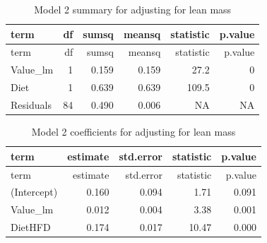 \documentclass[]{article}
\newenvironment{Shaded}{\begin{snugshade}}{\end{snugshade}}
\newcommand{\DataTypeTok}[1]{\textcolor[rgb]{0.13,0.29,0.53}{#1}}
\newcommand{\FloatTok}[1]{\textcolor[rgb]{0.00,0.00,0.81}{#1}}
\newcommand{\KeywordTok}[1]{\textcolor[rgb]{0.13,0.29,0.53}{\textbf{#1}}}
\newcommand{\NormalTok}[1]{#1}
\newcommand{\OperatorTok}[1]{\textcolor[rgb]{0.81,0.36,0.00}{\textbf{#1}}}
\newcommand{\StringTok}[1]{\textcolor[rgb]{0.31,0.60,0.02}{#1}}
\begin{document}
\begin{Shaded}
\end{Shaded}

\begin{longtable}[]{@{}lrrrrr@{}}
\caption{Model 2 summary for adjusting for lean mass}\tabularnewline
\toprule
term & df & sumsq & meansq & statistic & p.value\tabularnewline
\midrule
\endfirsthead
\toprule
term & df & sumsq & meansq & statistic & p.value\tabularnewline
\midrule
\endhead
Value\_lm & 1 & 0.159 & 0.159 & 27.2 & 0\tabularnewline
Diet & 1 & 0.639 & 0.639 & 109.5 & 0\tabularnewline
Residuals & 84 & 0.490 & 0.006 & NA & NA\tabularnewline
\bottomrule
\end{longtable}

\begin{Shaded}
\end{Shaded}

\begin{longtable}[]{@{}lrrrr@{}}
\caption{Model 2 coefficients for adjusting for lean
mass}\tabularnewline
\toprule
term & estimate & std.error & statistic & p.value\tabularnewline
\midrule
\endfirsthead
\toprule
term & estimate & std.error & statistic & p.value\tabularnewline
\midrule
\endhead
(Intercept) & 0.160 & 0.094 & 1.71 & 0.091\tabularnewline
Value\_lm & 0.012 & 0.004 & 3.38 & 0.001\tabularnewline
DietHFD & 0.174 & 0.017 & 10.47 & 0.000\tabularnewline
\bottomrule
\end{longtable}
\end{document}
